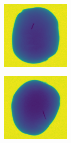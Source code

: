 \documentclass[11pt]{article}
\begin{document}
\begin{figure}[!h]
\begin{subfigure}[b]{0.22\textwidth}
         \caption{}
         \label{fig:metal_21}
     \end{subfigure}
     \hfill
     \begin{subfigure}[b]{0.22\textwidth}
         \centering
         \includegraphics[width=\textwidth]{figurer/potato_dataset/metal/metal_22.jpg}
         \caption{}
         \label{fig:metal_22}
     \end{subfigure}
     \hfill
     \begin{subfigure}[b]{0.22\textwidth}
         \centering
         \includegraphics[width=\textwidth]{figurer/potato_dataset/metal/metal_23.jpg}

\end{subfigure}
\end{figure}
\end{document}
